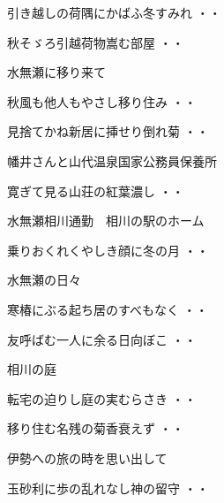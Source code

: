 \begin{shiika}引き越しの荷隅にかばふ冬すみれ
\hfill{・・}\end{shiika}
\begin{shiika}秋そゞろ引越荷物嵩む部屋
\hfill{・・}\end{shiika}
\vspace{0.6cm}
水無瀬に移り来て
\begin{shiika}秋風も他人もやさし移り住み
\hfill{・・}\end{shiika}
\begin{shiika}見捨てかね新居に挿せり倒れ菊
\hfill{・・}\end{shiika}
\vspace{0.6cm}
幡井さんと山代温泉国家公務員保養所
\begin{shiika}寛ぎて見る山荘の紅葉濃し
\hfill{・・}\end{shiika}
\vspace{0.6cm}
水無瀬相川通勤　相川の駅のホーム
\begin{shiika}乗りおくれくやしき顔に冬の月
\hfill{・・}\end{shiika}
\vspace{0.6cm}
水無瀬の日々
\begin{shiika}寒椿にぶる起ち居のすべもなく
\hfill{・・}\end{shiika}
\vspace{0.6cm}
\begin{shiika}友呼ばむ一人に余る日向ぼこ
\hfill{・・}\end{shiika}
\vspace{0.6cm}
相川の庭
\begin{shiika}転宅の迫りし庭の実むらさき
\hfill{・・}\end{shiika}
\begin{shiika}移り住む名残の菊香衰えず
\hfill{・・}\end{shiika}
\vspace{0.6cm}
伊勢への旅の時を思い出して
\begin{shiika}玉砂利に歩の乱れなし神の留守
\hfill{・・}\end{shiika}
\vspace{0.6cm}
